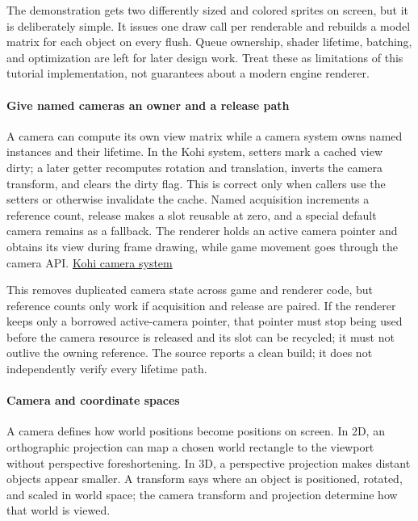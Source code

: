 The demonstration gets two differently sized and colored sprites on screen, but it is deliberately simple. It issues one draw call per renderable and rebuilds a model matrix for each object on every flush. Queue ownership, shader lifetime, batching, and optimization are left for later design work. Treat these as limitations of this tutorial implementation, not guarantees about a modern engine renderer.

\paragraph{Give named cameras an owner and a release path}\label{give-named-cameras-an-owner-and-a-release-path}

A camera can compute its own view matrix while a camera system owns named instances and their lifetime. In the Kohi system, setters mark a cached view dirty; a later getter recomputes rotation and translation, inverts the camera transform, and clears the dirty flag. This is correct only when callers use the setters or otherwise invalidate the cache. Named acquisition increments a reference count, release makes a slot reusable at zero, and a special default camera remains as a fallback. The renderer holds an active camera pointer and obtains its view during frame drawing, while game movement goes through the camera API. \href{https://www.youtube.com/watch?v=6UMJzh1RdOo}{Kohi camera system}

This removes duplicated camera state across game and renderer code, but reference counts only work if acquisition and release are paired. If the renderer keeps only a borrowed active-camera pointer, that pointer must stop being used before the camera resource is released and its slot can be recycled; it must not outlive the owning reference. The source reports a clean build; it does not independently verify every lifetime path.

\paragraph{Camera and coordinate spaces}\label{camera-and-coordinate-spaces}

A camera defines how world positions become positions on screen. In 2D, an orthographic projection can map a chosen world rectangle to the viewport without perspective foreshortening. In 3D, a perspective projection makes distant objects appear smaller. A transform says where an object is positioned, rotated, and scaled in world space; the camera transform and projection determine how that world is viewed.

